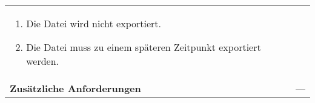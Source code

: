 \begin{longtabu}{p{0.5\textwidth}p{0.5\textwidth}}
\begin{enumerate}[label= (\alph*)]
{\begin{enumerate}[label= (\roman*)]
                        \item{Die Datei wird nicht exportiert.}
                        \item{Die Datei muss zu einem späteren Zeitpunkt
                                exportiert werden.}
                    \end{enumerate}
                }
        \end{enumerate}
        \\
    \cmidrule(r){1-1}\cmidrule(lr){2-2}
        \textbf{Zusätzliche Anforderungen} &
        ---\\
    \bottomrule
\end{longtabu}
